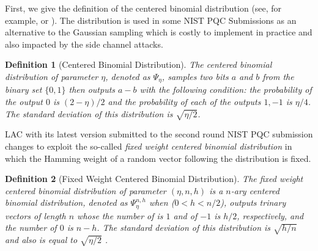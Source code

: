 \documentclass{cta-author}
\newtheorem{definition}{Definition}{}
\begin{document}
First, we give the definition of the centered binomial distribution (see, for example, \cite[Section 2.4 ]{LLJ+19} or \cite[Section 2.1]{DKRV19}). The distribution is used in some NIST PQC Submissions as an alternative to the Gaussian sampling which is costly to implement in practice  and also impacted by the side channel attacks.

\begin{definition}[Centered Binomial Distribution]
The centered binomial distribution of parameter $\eta$, denoted as $\Psi_\eta$,  samples two bits $a$ and $b$ from the binary set $\{0,1\}$ then outputs $a-b$ with the following condition: the probability of the output $0$ is $(2-\eta)/2$ and the probability of each of the outputs $1, -1$ is $\eta/4$. The standard deviation of this distribution is $\sqrt{\eta/2}$.
\end{definition}

LAC \cite{LLJ+19} with its latest version submitted to the second round NIST PQC submission changes to exploit the so-called \textit{fixed weight centered binomial distribution} in which the Hamming weight of a random vector following the distribution is fixed. 
\begin{definition}[Fixed Weight Centered Binomial Distribution] \label{fix}
	The fixed weight centered binomial distribution of parameter $(\eta, n, h)$ is a $n$-ary centered binomial distribution, denoted as $\Psi_\eta^{n,h}$ when ($0<h<n/2$), outputs trinary vectors of length $n$ whose the number of is $1$ and of $-1$ is $h/2$, respectively, and the number of $0$ is $n-h$. The standard deviation of this distribution is $\sqrt{h/n}$ and also is equal to $\sqrt{\eta/2}$ .
\end{definition}
\end{document}
